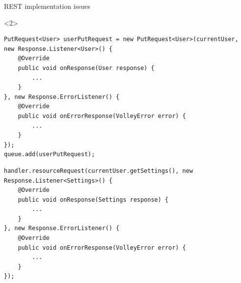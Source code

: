 \begin{frame}[fragile]{REST implementation issues}

\begin{onlyenv}<2>
\begin{center}
\begin{minipage}[H]{0.9\linewidth}
\begin{lstlisting}    
PutRequest<User> userPutRequest = new PutRequest<User>(currentUser, new Response.Listener<User>() {
	@Override
    public void onResponse(User response) {
    	...
    }
}, new Response.ErrorListener() {
    @Override
    public void onErrorResponse(VolleyError error) {
		...
    }
});
queue.add(userPutRequest);
\end{lstlisting} 
\begin{lstlisting}
handler.resourceRequest(currentUser.getSettings(), new Response.Listener<Settings>() {
	@Override
	public void onResponse(Settings response) {
		...	
	}
}, new Response.ErrorListener() {
	@Override
    public void onErrorResponse(VolleyError error) {
    	...
    }
});
\end{lstlisting} 
\end{minipage}
\end{center}
\end{onlyenv}
\end{frame}


